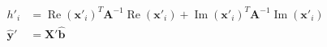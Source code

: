 \documentclass[10pt]{article}
\begin{document}
\begin{align*}\begin{split}
h'_i &= \operatorname{Re}\left(\boldsymbol x'_i\right)^T \boldsymbol A^{-1} \operatorname{Re}\left(\boldsymbol x'_i\right) +
\operatorname{Im}\left(\boldsymbol x'_i\right)^T \boldsymbol A^{-1} \operatorname{Im}\left(\boldsymbol x'_i\right) \\
\boldsymbol{\hat{y}}' &= \boldsymbol X' \boldsymbol{\hat{b}} \\
\end{split}\end{align*}
\end{document}
